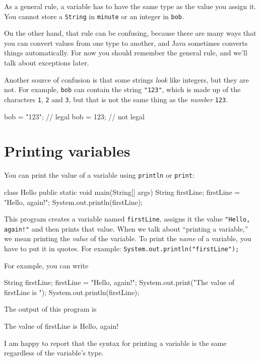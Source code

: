 As a general rule,
a variable has to have the same type as the
value you assign it.  You cannot store a {\tt String} in {\tt minute} or an
integer in {\tt bob}.

On the other hand, that rule can be confusing, because there are many
ways that you can convert values from one type to another, and Java
sometimes converts things automatically.  For now you should
remember the general rule, and we'll talk about exceptions later.

Another source of confusion is that some strings {\em look}
like integers, but they are not.  For example, {\tt bob}
can contain the string {\tt "123"}, which is made up of the
characters {\tt 1}, {\tt 2} and {\tt 3}, but that is not
the same thing as the {\em number} {\tt 123}.

\begin{code}
    bob = "123";     // legal
    bob = 123;       // not legal
\end{code}


\section{Printing variables}
\label{printing}

You can print the value of a variable using {\tt println} or
{\tt print}:

\begin{code}
class Hello {
  public static void main(String[] args) {
    String firstLine;
    firstLine = "Hello, again!";
    System.out.println(firstLine);
  }
}
\end{code}
%
This program creates a variable named {\tt firstLine}, assigns
it the value {\tt "Hello, again!"} and then prints that value.
When we talk about ``printing a variable,'' we mean printing
the {\em value} of the variable.  To print the {\em name} of
a variable, you have to put it in quotes.
For example: {\tt System.out.println("firstLine");}

For example, you can write

\begin{code}
    String firstLine;
    firstLine = "Hello, again!";
    System.out.print("The value of firstLine is ");
    System.out.println(firstLine);
\end{code}
%
The output of this program is

\begin{code}
The value of firstLine is Hello, again!
\end{code}
%
I am happy to report that the syntax for printing a variable
is the same regardless of the variable's type.

